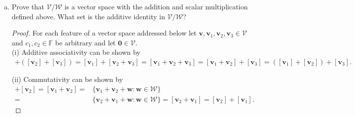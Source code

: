 \documentclass[12pt]{amsart}
\newcommand{\1}{\mathbbm{1}}
\numberwithin{equation}{section}
\numberwithin{Theorem}{section}
\theoremstyle{plain} %
\theoremstyle{definition}
\theoremstyle{remark}
\begin{document}
\begin{enumerate}[1.]
\begin{enumerate}[(a)]
\bigskip


(i) Since \([\mathbf{v}_{1}]=[\mathbf{v}_{2}]\) and \([\mathbf{u}_{1}]=[\mathbf{u}_{2}]\), 
\begin{align*}
	[\mathbf{v}_{1}] + [\mathbf{u}_{1}] = [\mathbf{v}_{2}] + [\mathbf{u}_{2}] 
\shortintertext{and using the definition of addition from above,}
	[\mathbf{v}_{1} + \mathbf{u}_{1}] = [\mathbf{v}_{2} + \mathbf{u}_{2}] .
\end{align*}
(ii) Since \([\mathbf{v}_{1}]=[\mathbf{v}_{2}]\),
\[
[c\mathbf{v}_1] = c[\mathbf{v}_1] = c[\mathbf{v}_2] = [c\mathbf{v}_2].
\]
	

\item Prove that \(\mathcal{V}/\mathcal{W}\) is a vector space with the addition and scalar multiplication defined above. What set is the additive identity in \(\mathcal{V}/\mathcal{W}\)?

\bigskip

\begin{proof}
For each feature of a vector space addressed below let
\(\mathbf{v},\mathbf{v}_1,\mathbf{v}_2,\mathbf{v}_3\in\mathcal{V}\)
and \(c_1,c_2\in\mathbb{F}\)
be arbitrary and let \(\mathbf{0}\in\mathcal{V}\). \\

(i) Additive associativity can be shown by
\begin{align*}
[\mathbf{v}_1] + ([\mathbf{v}_2]+[\mathbf{v}_3]) =
[\mathbf{v}_1] + [\mathbf{v}_2+\mathbf{v}_3] =
[\mathbf{v}_1+\mathbf{v}_2+\mathbf{v}_3] =
[\mathbf{v}_1+\mathbf{v}_2]+[\mathbf{v}_3] =
([\mathbf{v}_1]+[\mathbf{v}_2])+[\mathbf{v}_3]
.\end{align*}

(ii) Commutativity can be shown  by
\begin{align*}
[\mathbf{v}_1] + [\mathbf{v}_2] =
[\mathbf{v}_1 + \mathbf{v}_2] =
&\{\mathbf{v}_1+\mathbf{v}_2+\mathbf{w}:\mathbf{w}\in\mathcal{W}\} \\ =
&\{\mathbf{v}_2+\mathbf{v}_1+\mathbf{w}:\mathbf{w}\in\mathcal{W}\} =
[\mathbf{v}_2 + \mathbf{v}_1] =
[\mathbf{v}_2] + [\mathbf{v}_1].
\end{align*}


\end{proof}
\end{enumerate}
\end{enumerate}
\end{document}
